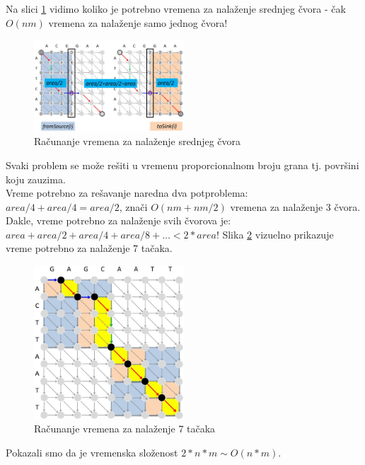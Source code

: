 Na slici \ref{slika:sourceSink} vidimo koliko je potrebno vremena za nalaženje srednjeg čvora - čak $O(nm)$ vremena za nalaženje samo jednog čvora!
\begin{figure}[h]
\centering
\includegraphics[width=0.5\textwidth]{poglavlja/5/slike/sourceSink.JPG}
\caption{Računanje vremena za nalaženje srednjeg čvora}
\label{slika:sourceSink}
\end{figure}

Svaki problem se može rešiti u vremenu proporcionalnom broju grana tj. površini koju zauzima. \\
Vreme potrebno za rešavanje naredna dva potproblema: $area/4 + area/4 = area/2$, znači  $O(nm + nm/2)$ vremena za nalaženje 3 čvora. \\
Dakle, vreme potrebno za nalaženje svih čvorova je: $area + area/2 + area/4 + area/8 + \dots < 2 * area$! Slika \ref{slika:vreme} vizuelno prikazuje vreme potrebno za nalaženje 7 tačaka. \\

\begin{figure}[h]
\centering
\includegraphics[width=0.5\textwidth]{poglavlja/5/slike/vremenskaSlozenostPPV.JPG}
\caption{Računanje vremena za nalaženje 7 tačaka}
\label{slika:vreme}
\end{figure}

Pokazali smo da je vremenska složenost $2*n*m \sim O(n*m)$. \\


